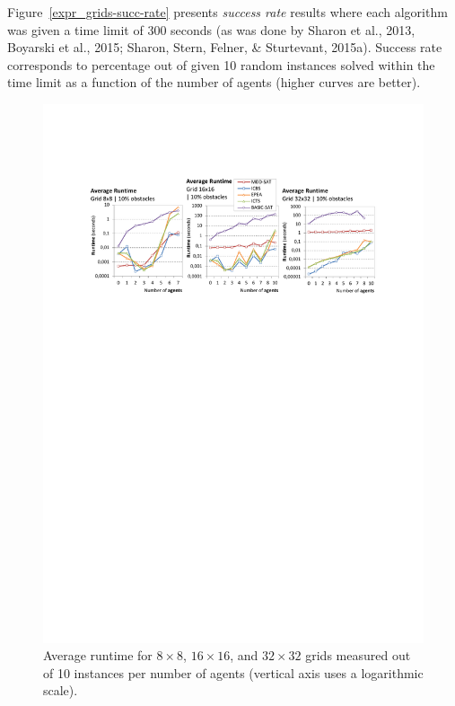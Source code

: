\documentclass[jair,oneside,11pt]{article}
\begin{document}
Figure~\ref{expr_grids-succ-rate} presents {\em success rate} results where each algorithm was given a time limit of 300 seconds (as was done by Sharon et al., 2013, Boyarski et al., 2015; Sharon, Stern, Felner, \& Sturtevant, 2015a). Success rate corresponds to percentage out of given 10 random instances solved within the time limit as a function of the number of agents (higher curves are better).


\begin{figure}[h]
\centering
\includegraphics[trim={2.5cm 19.0cm 2.5cm 3.5cm},clip,width=\textwidth]{expr_grids-average.pdf}
\vspace{-0.4cm}
\caption{Average runtime for $8{}\times{}8$, $16{}\times{}16$, and $32{}\times{}32$ grids measured out of 10 instances per number of agents (vertical axis uses a logarithmic scale).}
\label{expr_grids-average}
\end{figure}
\end{document}

